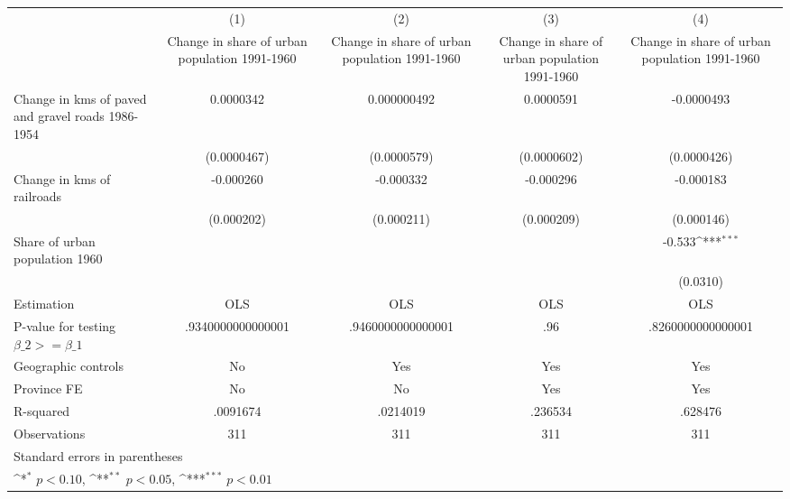 {
\def\sym#1{\ifmmode^{#1}\else\(^{#1}\)\fi}
\begin{tabular}{l*{4}{c}}
\hline\hline
                    &\multicolumn{1}{c}{(1)}&\multicolumn{1}{c}{(2)}&\multicolumn{1}{c}{(3)}&\multicolumn{1}{c}{(4)}\\
                    &\multicolumn{1}{c}{Change in share of urban population 1991-1960}&\multicolumn{1}{c}{Change in share of urban population 1991-1960}&\multicolumn{1}{c}{Change in share of urban population 1991-1960}&\multicolumn{1}{c}{Change in share of urban population 1991-1960}\\
\hline
Change in kms of paved and gravel roads 1986-1954&   0.0000342         & 0.000000492         &   0.0000591         &  -0.0000493         \\
                    & (0.0000467)         & (0.0000579)         & (0.0000602)         & (0.0000426)         \\
[1em]
Change in kms of railroads&   -0.000260         &   -0.000332         &   -0.000296         &   -0.000183         \\
                    &  (0.000202)         &  (0.000211)         &  (0.000209)         &  (0.000146)         \\
[1em]
Share of urban population 1960&                     &                     &                     &      -0.533\sym{***}\\
                    &                     &                     &                     &    (0.0310)         \\
\hline
Estimation          &         OLS         &         OLS         &         OLS         &         OLS         \\
P-value for testing $\beta\_2 >= \beta\_1$&.9340000000000001         &.9460000000000001         &         .96         &.8260000000000001         \\
Geographic controls &          No         &         Yes         &         Yes         &         Yes         \\
Province FE         &          No         &          No         &         Yes         &         Yes         \\
R-squared           &    .0091674         &    .0214019         &     .236534         &     .628476         \\
Observations        &         311         &         311         &         311         &         311         \\
\hline\hline
\multicolumn{5}{l}{\footnotesize Standard errors in parentheses}\\
\multicolumn{5}{l}{\footnotesize \sym{*} \(p<0.10\), \sym{**} \(p<0.05\), \sym{***} \(p<0.01\)}\\
\end{tabular}
}
